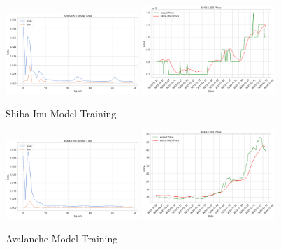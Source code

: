 \documentclass{ledger}
\begin{document}
\begin{figure}[htbp]
    \centering
    \includegraphics[width=0.45\textwidth]{code/price-prediction/lstm/images/shib_usd_loss.png} %
    \hspace{0.05\textwidth} %
    \includegraphics[width=0.45\textwidth]{code/price-prediction/lstm/images/shib_usd_price.png} %
    \caption{Shiba Inu Model Training}
    \label{fig:side_by_side}
\end{figure}

\begin{figure}[htbp]
    \centering
    \includegraphics[width=0.45\textwidth]{code/price-prediction/lstm/images/avax_usd_loss.png} %
    \hspace{0.05\textwidth} %
    \includegraphics[width=0.45\textwidth]{code/price-prediction/lstm/images/avax_usd_price.png} %
    \caption{Avalanche Model Training}
    \label{fig:side_by_side}
\end{figure}
\end{document}
